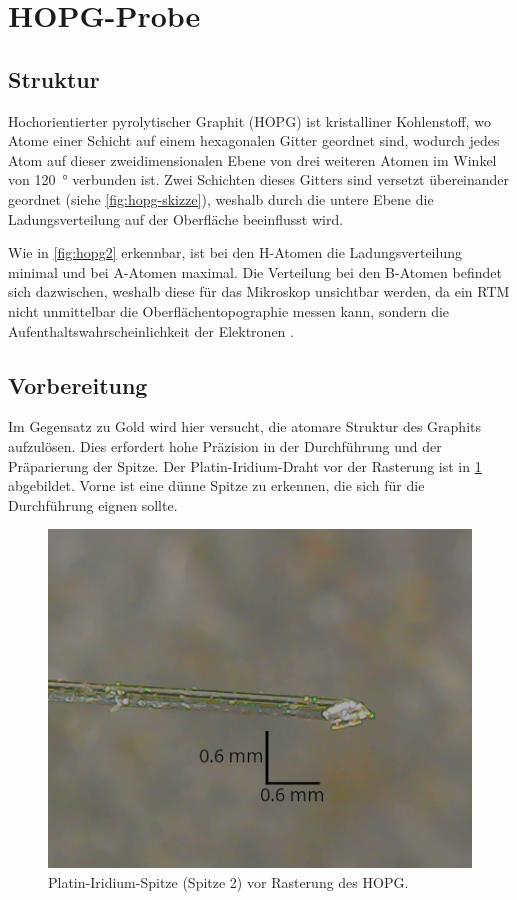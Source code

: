 \section{HOPG-Probe}\label{sec:hopg-probe}
\subsection*{Struktur}
Hochorientierter pyrolytischer Graphit (HOPG) ist kristalliner Kohlenstoff, wo Atome einer Schicht
auf einem hexagonalen Gitter geordnet sind, wodurch jedes Atom auf dieser zweidimensionalen
Ebene von drei weiteren Atomen im Winkel von \SI{120}{\degree} verbunden ist. Zwei Schichten
dieses Gitters sind versetzt übereinander geordnet (siehe \cref{fig:hopg-skizze}), weshalb durch die
untere Ebene die Ladungsverteilung auf der Oberfläche beeinflusst wird.\par Wie in
\cref{fig:hopg2} erkennbar, ist bei den H-Atomen die Ladungsverteilung minimal und bei A-Atomen maximal.
Die Verteilung bei den B-Atomen befindet sich dazwischen, weshalb diese für das Mikroskop unsichtbar werden,
da ein RTM nicht unmittelbar die Oberflächentopographie messen kann, sondern die Aufenthaltswahrscheinlichkeit der
Elektronen \cite{rtm-leitpfaden}.



\subsection*{Vorbereitung}
Im Gegensatz zu Gold wird hier versucht, die atomare Struktur des Graphits aufzulösen.
Dies erfordert hohe Präzision in der Durchführung und der Präparierung der Spitze. Der Platin-Iridium-Draht
vor der Rasterung ist in \cref{fig:spitze_hopg_vorher_v2} abgebildet. Vorne ist eine dünne Spitze zu erkennen,
die sich für die Durchführung eignen sollte.

\begin{figure}[htb]
	\centering
	\includegraphics[width=0.5\linewidth]{figs/spitze_hopg_vorher_v2.png}
	\caption{Platin-Iridium-Spitze (Spitze 2) vor Rasterung des HOPG.}
	\label{fig:spitze_hopg_vorher_v2}
\end{figure}

